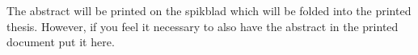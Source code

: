 

\begin{abstracts} %

The abstract will be printed on the spikblad which will be folded into the printed thesis. However, if you feel it necessary to also have the abstract in the printed document put it here.

\end{abstracts}

